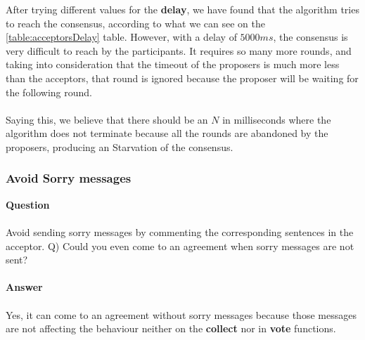 \documentclass[a4paper, 10pt]{article}
\begin{document}
After trying different values for the \textbf{delay}, we have found that the
algorithm tries to reach the consensus, according to what we can see on the
\ref{table:acceptorsDelay} table. However, with a delay of $5000
ms$, the consensus is very difficult to reach by the participants. It requires so
many more rounds, and taking into consideration that the timeout of the
proposers is much more less than the acceptors, that round is ignored because the proposer will be waiting for the following round.
\\\\
Saying this, we believe that there should be an $N$ in milliseconds where the
algorithm does not terminate because all the rounds are abandoned by the proposers, producing an Starvation of the consensus.

\subsubsection{Avoid Sorry messages}
\textbf{\large{Question}}\\\\
Avoid sending sorry messages by commenting the corresponding sentences in the
acceptor. Q) Could you even come to an agreement when sorry messages are not
sent?
\\\\
\textbf{\large{Answer}}\\\\
Yes, it can come to an agreement without sorry messages because those messages
are not affecting the behaviour neither on the \textbf{collect} nor in \textbf{vote} functions.
\\\\
\end{document}
